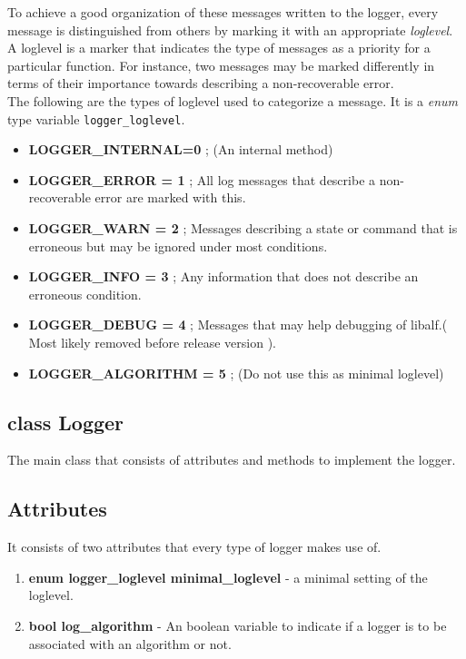 To achieve a good organization of these messages written to the logger, every message is distinguished from others by marking it with an appropriate \emph{loglevel}. A loglevel is a marker that indicates the type of messages as a priority for a particular function. For instance, two messages may be marked differently in terms of their importance towards describing a non-recoverable error. \\

The following are the types of loglevel used to categorize a message. It is a \emph{enum} type variable \texttt{logger\_loglevel}.
\begin{itemize}
 \item \textbf{LOGGER\_INTERNAL=0} ; (An internal method)
 \item \textbf{LOGGER\_ERROR = 1} ; All log messages that describe a non-recoverable error are marked with this.
 \item \textbf{LOGGER\_WARN = 2} ; Messages describing a state or command that is erroneous but may be ignored under most conditions.
 \item \textbf{LOGGER\_INFO = 3} ; Any information that does not describe an erroneous condition.
 \item \textbf{LOGGER\_DEBUG = 4} ; Messages that may help debugging of libalf.( Most likely removed before release version ).
 \item \textbf{LOGGER\_ALGORITHM = 5} ; (Do not use this as minimal loglevel)
\end{itemize}

\subsection{class Logger}
The main class that consists of attributes and methods to implement the logger. 

\subsection*{Attributes} 
It consists of two attributes that every type of logger makes use of.
\begin{enumerate}
 \item \textbf{enum logger\_loglevel minimal\_loglevel} - a minimal setting of the loglevel.
 \item \textbf{bool log\_algorithm} - An boolean variable to indicate if a logger is to be associated with an algorithm or not.
\end{enumerate}

